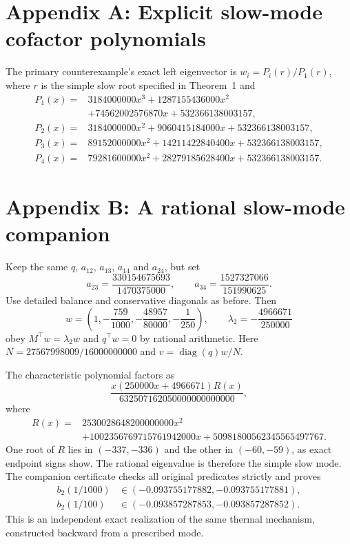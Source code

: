 \documentclass[11pt]{article}
\newcommand{\diag}{\operatorname{diag}}
\begin{document}
\section*{Appendix A: Explicit slow-mode cofactor polynomials}\label{app:cofactors}
The primary counterexample's exact left eigenvector is $w_i=P_i(r)/P_1(r)$, where $r$ is the simple slow root specified in Theorem~1 and
\begin{align*}
P_1(x)={}&3184000000x^3+1287155436000x^2\\
&+74562002576870x+532366138003157,\\
P_2(x)={}&3184000000x^2+9060415184000x+532366138003157,\\
P_3(x)={}&89152000000x^2+14211422840400x+532366138003157,\\
P_4(x)={}&79281600000x^2+28279185628400x+532366138003157.
\end{align*}

\section*{Appendix B: A rational slow-mode companion}
Keep the same $q$, $a_{12}$, $a_{13}$, $a_{14}$ and $a_{24}$, but set
\[
a_{23}=\frac{330154675693}{1470375000},\qquad
 a_{34}=\frac{1527327066}{151990625}.
\]
Use detailed balance and conservative diagonals as before. Then
\[
w=\left(1,-\frac{759}{1000},-\frac{48957}{80000},-\frac1{250}\right),
\qquad \lambda_2=-\frac{4966671}{250000}
\]
obey $M^\top w=\lambda_2w$ and $q^\top w=0$ by rational arithmetic. Here $N=27567998009/16000000000$ and $v=\diag(q)w/N$.

The characteristic polynomial factors as
\[
\frac{x(250000x+4966671)R(x)}{632507162050000000000000},
\]
where
\begin{align*}
R(x)={}&2530028648200000000x^2\\
&+1002356769715761942000x+50981800562345565497767.
\end{align*}
One root of $R$ lies in $(-337,-336)$ and the other in $(-60,-59)$, as exact endpoint signs show. The rational eigenvalue is therefore the simple slow mode. The companion certificate checks all original predicates strictly and proves
\begin{align*}
b_2(1/1000)&\in(-0.093755177882,-0.093755177881),\\
b_2(1/100)&\in(-0.093857287853,-0.093857287852).
\end{align*}
This is an independent exact realization of the same thermal mechanism, constructed backward from a prescribed mode.
\end{document}
